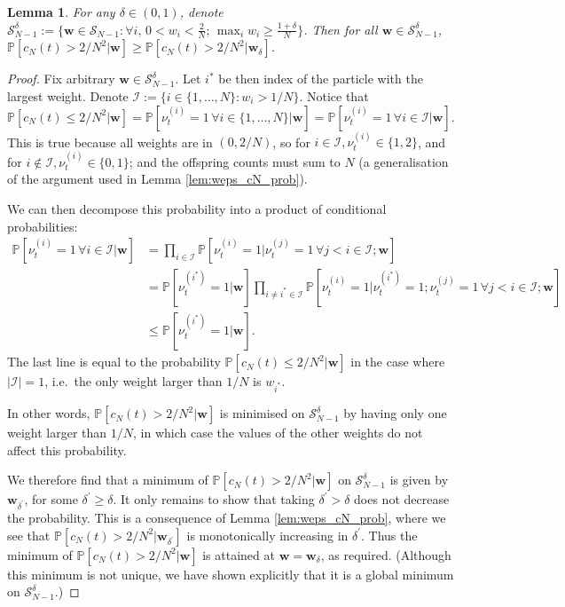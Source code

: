 \documentclass{article}
\newtheorem{lemma}{Lemma}
\newcommand{\PR}{\mathbb{P}}
\begin{document}
\begin{lemma}
For any $\delta \in (0, 1)$, denote $\mathcal{S}_{N-1}^\delta := \{ \mathbf{w} \in \mathcal{S}_{N-1} :  \forall i, \, 0 <w_i <\frac{2}{N} ;\, \max_i w_i \geq \frac{1 + \delta}{N} \}$.
Then for all $\mathbf{w} \in \mathcal{S}_{N-1}^\delta$, 
$\PR[c_N(t) > 2/N^2 | \mathbf{w} ] \geq \PR[c_N(t) > 2/N^2 | \mathbf{w}_\delta ]$.
\end{lemma}

\begin{proof}
Fix arbitrary $\mathbf{w} \in \mathcal{S}_{N-1}^\delta$. Let $i^*$ be then index of the particle with the largest weight.
Denote $\mathcal{I} := \{i \in \{1,\dots,N\} : w_i > 1/N \}$.
Notice that 
\begin{equation*}
\PR[ c_N(t) \leq 2/N^2 | \mathbf{w} ] 
= \PR[ \nu_t^{(i)} =1 \,\forall i\in\{1,\dots,N\} | \mathbf{w}] 
= \PR[ \nu_t^{(i)} =1 \,\forall i\in \mathcal{I} | \mathbf{w}] .
\end{equation*}
This is true because all weights are in $(0, 2/N)$, so for $i \in \mathcal{I}, \nu_t^{(i)} \in \{1,2\}$, and for $i \notin \mathcal{I}, \nu_t^{(i)} \in \{0,1\}$; and the offspring counts must sum to $N$ (a generalisation of the argument used in Lemma \ref{lem:weps_cN_prob}).

We can then decompose this probability into a product of conditional probabilities:
\begin{align*}
\PR[ \nu_t^{(i)} =1 \,\forall i\in \mathcal{I} | \mathbf{w}]
&= \prod_{i \in \mathcal{I}} \PR[ \nu_t^{(i)} =1 | \nu_t^{(j)}=1 \,\forall j <i \in \mathcal{I}; \mathbf{w}] \\
&= \PR[\nu_t^{(i^*)} =1 | \mathbf{w}] \prod_{i \neq i^* \in \mathcal{I}} \PR[ \nu_t^{(i)} =1 | \nu_t^{(i^*)}=1; \nu_t^{(j)}=1 \,\forall j <i \in \mathcal{I}; \mathbf{w}] \\
&\leq \PR[\nu_t^{(i^*)} =1 | \mathbf{w}] .
\end{align*}
The last line is equal to the probability $\PR[ c_N(t) \leq 2/N^2 | \mathbf{w} ] $ in the case where $|\mathcal{I}| =1$, i.e.\ the only weight larger than $1/N$ is $w_{i^*}$.

In other words, $\PR[ c_N(t) > 2/N^2 | \mathbf{w} ]$ is minimised on $\mathcal{S}_{N-1}^\delta$ by having only one weight larger than $1/N$, in which case the values of the other weights do not affect this probability. 

We therefore find that a minimum of $\PR[ c_N(t) > 2/N^2 | \mathbf{w} ]$ on $\mathcal{S}_{N-1}^\delta$ is given by $\mathbf{w}_{\delta^\prime}$, for some $\delta^\prime \geq \delta$. 
It only remains to show that taking $\delta^\prime > \delta$ does not decrease the probability. This is a consequence of Lemma \ref{lem:weps_cN_prob}, where we see that $\PR[ c_N(t) > 2/N^2 | \mathbf{w}_{\delta^\prime}]$ is monotonically increasing in $\delta^\prime$.
Thus the minimum of $\PR[ c_N(t) > 2/N^2 | \mathbf{w} ]$ is attained at $\mathbf{w} = \mathbf{w}_\delta$, as required. (Although this minimum is not unique, we have shown explicitly that it is a global minimum on $\mathcal{S}_{N-1}^\delta$.)
\end{proof}
\end{document}
